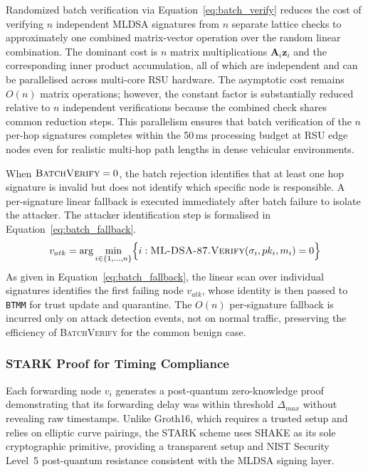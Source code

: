 \documentclass[12pt, a4paper]{report}
\begin{document}
Randomized batch verification via
Equation~\eqref{eq:batch_verify} reduces the cost
of verifying $n$ independent \ac{MLDSA} signatures
from $n$ separate lattice checks to approximately
one combined matrix-vector operation over the random
linear combination. The dominant cost is $n$ matrix
multiplications $\mathbf{A}_i \mathbf{z}_i$ and the
corresponding inner product accumulation, all of which
are independent and can be parallelised across
multi-core \ac{RSU} hardware. The asymptotic cost
remains $O(n)$ matrix operations; however, the
constant factor is substantially reduced relative
to $n$ independent verifications because the combined
check shares common reduction steps. This parallelism
ensures that batch verification of the $n$ per-hop
signatures completes within the 50\,ms processing
budget at \ac{RSU} edge nodes even for realistic
multi-hop path lengths in dense vehicular environments.

When $\textsc{BatchVerify}=0$, the batch rejection
identifies that at least one hop signature is invalid
but does not identify which specific node is responsible.
A per-signature linear fallback is executed immediately
after batch failure to isolate the attacker. The
attacker identification step is formalised in
Equation~\eqref{eq:batch_fallback}.
\begin{equation}
v_{atk} = \arg\min_{i \in \{1,\ldots,n\}}
\Bigl\{i :
\textsc{ML-DSA-87.Verify}(\sigma_i, pk_i, m_i) = 0
\Bigr\}
\label{eq:batch_fallback}
\end{equation}
As given in Equation~\eqref{eq:batch_fallback}, the
linear scan over individual signatures identifies the
first failing node $v_{atk}$, whose identity is then
passed to \texttt{BTMM} for trust update and
quarantine. The $O(n)$ per-signature fallback is
incurred only on attack detection events, not on
normal traffic, preserving the efficiency of
\textsc{BatchVerify} for the common benign case.




\subsubsection{STARK Proof for Timing Compliance}

Each forwarding node $v_i$ generates a post-quantum
zero-knowledge proof demonstrating that its forwarding
delay was within threshold $\Delta_{max}$ without
revealing raw timestamps. Unlike Groth16, which requires
a trusted setup and relies on elliptic curve pairings,
the \ac{STARK} scheme uses \ac{SHAKE} as its sole
cryptographic primitive, providing a transparent setup
and NIST Security Level~5 post-quantum resistance
consistent with the \ac{MLDSA} signing layer.
\end{document}
